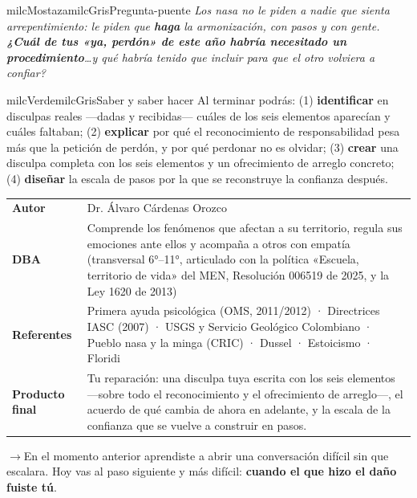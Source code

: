 \documentclass[11pt,letterpaper]{article}
\newcommand{\puente}[1]{%
  \begin{puentebox}%
    \textcolor{milcGradeDark}{$\rightarrow$}\hspace{2mm}#1%
  \end{puentebox}%
}
\begin{document}
\begin{softbox}{milcMostaza}{milcGris}{Pregunta-puente}
\textit{Los nasa no le piden a nadie que \emph{sienta} arrepentimiento: le piden que \textbf{haga} la armonización, con pasos y con gente. \textbf{¿Cuál de tus «ya, perdón» de este año habría necesitado un procedimiento}\ldots y qué habría tenido que incluir para que el otro volviera a confiar?}
\end{softbox}

\begin{softbox}{milcVerde}{milcGris}{Saber y saber hacer}
Al terminar podrás: (1) \textbf{identificar} en disculpas reales ---dadas y recibidas--- cuáles de los seis elementos aparecían y cuáles faltaban; (2) \textbf{explicar} por qué el reconocimiento de responsabilidad pesa más que la petición de perdón, y por qué perdonar no es olvidar; (3) \textbf{crear} una disculpa completa con los seis elementos y un ofrecimiento de arreglo concreto; (4) \textbf{diseñar} la escala de pasos por la que se reconstruye la confianza después.
\end{softbox}



\small
\begin{tabularx}{\textwidth}{>{\bfseries}p{3.0cm}Y}
Autor & Dr. Álvaro Cárdenas Orozco\\
DBA & Comprende los fenómenos que afectan a su territorio, regula sus emociones ante ellos y acompaña a otros con empatía (transversal 6°--11°, articulado con la política «Escuela, territorio de vida» del MEN, Resolución 006519 de 2025, y la Ley 1620 de 2013)\\
Referentes & Primera ayuda psicológica (OMS, 2011/2012) · Directrices IASC (2007) · USGS y Servicio Geológico Colombiano · Pueblo nasa y la minga (CRIC) · Dussel · Estoicismo · Floridi\\
Producto final & Tu reparación: una disculpa tuya escrita con los seis elementos —sobre todo el reconocimiento y el ofrecimiento de arreglo—, el acuerdo de qué cambia de ahora en adelante, y la escala de la confianza que se vuelve a construir en pasos.\\
\end{tabularx}
\normalsize

\puente{En el momento anterior aprendiste a abrir una conversación difícil sin que escalara. Hoy vas al paso siguiente y más difícil: \textbf{cuando el que hizo el daño fuiste tú}.}
\end{document}
